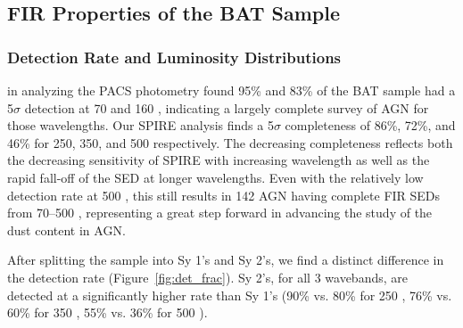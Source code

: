 \subsection{FIR Properties of the BAT Sample }
\subsubsection{Detection Rate and Luminosity Distributions}
\citet{Melendez:2014yu} in analyzing the PACS photometry found 95\% and 83\% of the BAT sample had a 5$\sigma$ detection at 70 and 160 \micron, indicating a largely complete survey of AGN for those wavelengths. Our SPIRE analysis finds a 5$\sigma$ completeness of 86\%, 72\%, and 46\% for 250, 350, and 500 \micron{} respectively. The decreasing completeness reflects both the decreasing sensitivity of SPIRE with increasing wavelength as well as the rapid fall-off of the SED at longer wavelengths. Even with the relatively low detection rate at 500 \micron{}, this still results in 142 AGN having complete FIR SEDs from 70--500 \um, representing a great step forward in advancing the study of the dust content in AGN. 

After splitting the sample into Sy 1's and Sy 2's, we find a distinct difference in the detection rate (Figure~\ref{fig:det_frac}). Sy 2's, for all 3 wavebands, are detected at a significantly higher rate than Sy 1's (90\% vs. 80\% for 250 \um, 76\% vs. 60\% for 350 \um, 55\% vs. 36\% for 500 \um).
  